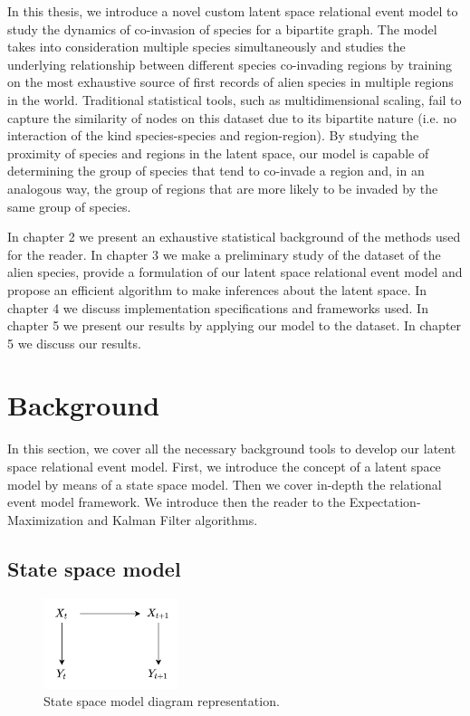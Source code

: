\documentclass[mscthesis]{usiinfthesis}
\begin{document}
In this thesis, we introduce a novel custom latent space relational event model to study the dynamics of co-invasion of species for a bipartite graph. The model takes into consideration multiple species simultaneously and studies the underlying relationship between different species co-invading regions by training on the most exhaustive source of first records of alien species in multiple regions in the world. Traditional statistical tools, such as multidimensional scaling, fail to capture the similarity of nodes on this dataset due to its bipartite nature (i.e. no interaction of the kind species-species and region-region). By studying the proximity of species and regions in the latent space, our model is capable of determining the group of species that tend to co-invade a region and, in an analogous way, the group of regions that are more likely to be invaded by the same group of species. 

In chapter 2 we present an exhaustive statistical background of the methods used for the reader. In chapter 3 we make a preliminary study of the dataset of the alien species, provide a formulation of our latent space relational event model and propose an efficient algorithm to make inferences about the latent space. In chapter 4 we discuss implementation specifications and frameworks used. In chapter 5 we present our results by applying our model to the dataset. In chapter 5 we discuss our results.


\chapter{Background}

In this section, we cover all the necessary background tools to develop our latent space relational event model. First, we introduce the concept of a latent space model by means of a state space model. Then we cover in-depth the relational event model framework. We introduce then the reader to the Expectation-Maximization and Kalman Filter algorithms. 

\section{State space model}
\label{sec:latent_space}

\begin{figure}[H]
    \centering
    \includegraphics[width=0.35\textwidth]{statespace_diagram.png}
    \caption{State space model diagram representation.}
    \label{fig:pdf_invasion}
\end{figure}
\end{document}
